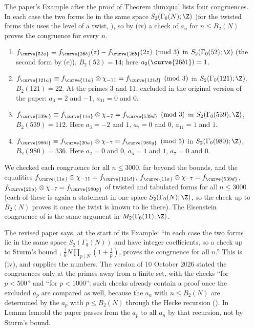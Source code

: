 \begin{example}\label{ex:modforms:paper-congruences}
The paper's Example after the proof of Theorem thm:qual lists four congruences. In each case the two forms lie in the same space $S_2(\Gamma_0(N);\Z)$ (for the twisted forms this
uses the level of a twist, ), so by (iv) a check of $a_n$ for $n\le B_2(N)$ proves the congruence for every $n$.
\begin{enumerate}[label=(\alph*)]
\item $f_{\curve{52a}}\equiv f_{\curve{26b}}(z)-f_{\curve{26b}}(2z)\pmod3$ in $S_2(\Gamma_0(52);\Z)$ (the second form by (e)), $B_2(52)=14$; here $a_2(\curve{26b1})=1$.
\item $f_{\curve{121a}}\equiv f_{\curve{11a}}\otimes\chi_{-11}=f_{\curve{121d}}\pmod3$ in $S_2(\Gamma_0(121);\Z)$, $B_2(121)=22$. At the primes $3$ and $11$, excluded in the original version of
the paper: $a_3=2$ and $-1$, $a_{11}=0$ and $0$.
\item $f_{\curve{539c}}\equiv f_{\curve{11a}}\otimes\chi_{-7}=f_{\curve{539d}}\pmod3$ in $S_2(\Gamma_0(539);\Z)$, $B_2(539)=112$. Here $a_3=-2$ and $1$, $a_7=0$ and $0$, $a_{11}=1$ and $1$.
\item $f_{\curve{980i}}\equiv f_{\curve{20a}}\otimes\chi_{-7}=f_{\curve{980g}}\pmod5$ in $S_2(\Gamma_0(980);\Z)$, $B_2(980)=336$. Here $a_2=0$ and $0$, $a_5=1$ and $1$, $a_7=0$ and $0$.
\end{enumerate}
We checked each congruence for all $n\le3000$, far beyond the bounds, and the equalities $f_{\curve{11a}}\otimes\chi_{-11}=f_{\curve{121d}}$, $f_{\curve{11a}}\otimes\chi_{-7}=f_{\curve{539d}}$,
$f_{\curve{20a}}\otimes\chi_{-7}=f_{\curve{980g}}$ of twisted and tabulated forms for all $n\le3000$ (each of these is again a statement in one space $S_2(\Gamma_0(N);\Z)$, so the check up to
$B_2(N)$ proves it once the twist is known to lie there). The Eisenstein congruence of  is the same argument in $M_2(\Gamma_0(11);\Z)$.
\end{example}

\begin{paperlink}\label{pl:modforms:example}
The revised paper says, at the start of its Example: ``in each case the two forms lie in the same space $S_2(\Gamma_0(N))$ and have integer coefficients, so a check up to Sturm's bound
\cite{Sturm87}, $\frac16N\prod_{p\mid N}(1+\frac1p)$, proves the congruence for all $n$.'' This is (iv), and 
supplies the numbers. The version of 10 October 2026 stated the congruences only at the primes away from a finite set, with the checks ``for $p<500$'' and ``for $p<1000$''; such
checks already contain a proof once the excluded $a_p$ are compared as well, because the $a_n$ with $n\le B_2(N)$ are determined by the $a_p$ with $p\le B_2(N)$ through the Hecke recursion
(). In Lemma lem:old the paper passes from the $a_p$ to all $a_n$ by that recursion, not by Sturm's bound.
\end{paperlink}

